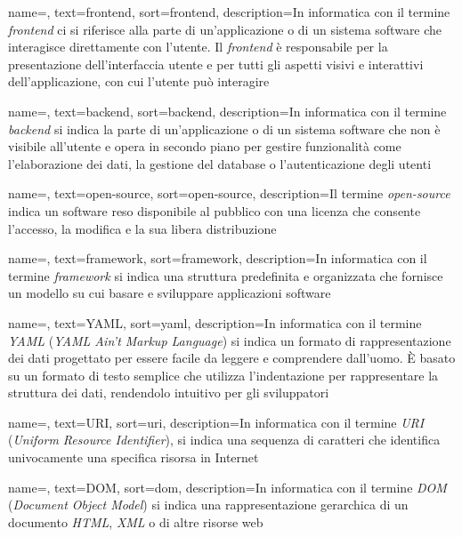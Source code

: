  {
    name=,
    text=frontend,
    sort=frontend,
    description={In informatica con il termine \emph{frontend} ci si riferisce alla parte di un'applicazione o di un sistema software che interagisce direttamente con l'utente. 
    Il \emph{frontend} è responsabile per la presentazione dell'interfaccia utente e per tutti gli aspetti visivi e interattivi dell'applicazione, con cui l'utente può interagire}
}

 {
    name=,
    text=backend,
    sort=backend,
    description={In informatica con il termine \emph{backend} si indica la parte di un'applicazione o di un sistema software che non è visibile all'utente e opera in secondo piano per gestire funzionalità come l'elaborazione dei dati, la gestione del database o l'autenticazione degli utenti}
}

 {
    name=,
    text=open-source,
    sort=open-source,
    description={Il termine \emph{open-source} indica un software reso disponibile al pubblico con una licenza che consente l'accesso, la modifica e la sua libera distribuzione}
}

 {
    name=,
    text=framework,
    sort=framework,
    description={In informatica con il termine \emph{framework} si indica una struttura predefinita e organizzata che fornisce un modello su cui basare e sviluppare applicazioni software}
}

 {
    name=,
    text=YAML,
    sort=yaml,
    description={In informatica con il termine \emph{YAML} (\emph{YAML Ain't Markup Language}) si indica un formato di rappresentazione dei dati progettato per essere facile da leggere e comprendere dall'uomo. È basato su un formato di testo semplice che utilizza l'indentazione per rappresentare la struttura dei dati, rendendolo intuitivo per gli sviluppatori}
}

 {
    name=,
    text=URI,
    sort=uri,
    description={In informatica con il termine \emph{URI} (\emph{Uniform Resource Identifier}), si indica una sequenza di caratteri che identifica univocamente una specifica risorsa in Internet}
}

 {
    name=,
    text=DOM,
    sort=dom,
    description={In informatica con il termine \emph{DOM} (\emph{Document Object Model}) si indica una rappresentazione gerarchica di un documento \emph{HTML}, \emph{XML} o di altre risorse web}
}

